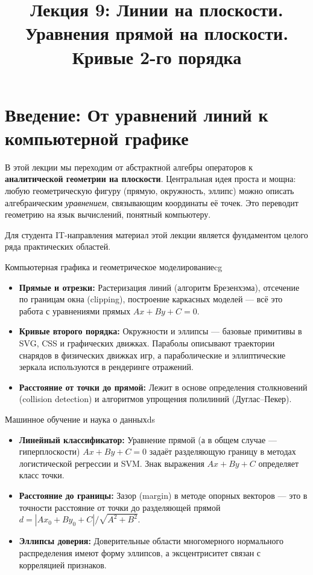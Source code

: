 \documentclass[12pt,a4paper]{article}
\title{Лекция 9: Линии на плоскости. Уравнения прямой на плоскости.
Кривые 2-го порядка}
\author{}
\date{}
\begin{document}
\maketitle
\thispagestyle{fancy}

\section*{Введение: От уравнений линий к компьютерной графике}

В этой лекции мы переходим от абстрактной алгебры операторов к
\textbf{аналитической геометрии на плоскости}. Центральная идея проста и
мощна: любую геометрическую фигуру (прямую, окружность, эллипс) можно
описать алгебраическим \emph{уравнением}, связывающим координаты её точек.
Это переводит геометрию на язык вычислений, понятный компьютеру.

Для студента IT-направления материал этой лекции является фундаментом
целого ряда практических областей.

\begin{remarkIT}{Компьютерная графика и геометрическое моделирование}{cg}
  \begin{itemize}
    \item \textbf{Прямые и отрезки:} Растеризация линий (алгоритм
      Брезенхэма), отсечение по границам окна (clipping), построение
      каркасных моделей — всё это работа с уравнениями прямых
      $Ax + By + C = 0$.
    \item \textbf{Кривые второго порядка:} Окружности и эллипсы — базовые
      примитивы в SVG, CSS и графических движках. Параболы описывают
      траектории снарядов в физических движках игр, а параболические и
      эллиптические зеркала используются в рендеринге отражений.
    \item \textbf{Расстояние от точки до прямой:} Лежит в основе
      определения столкновений (collision detection) и алгоритмов
      упрощения полилиний (Дуглас–Пекер).
  \end{itemize}
\end{remarkIT}

\begin{remarkIT}{Машинное обучение и наука о данных}{ds}
  \begin{itemize}
    \item \textbf{Линейный классификатор:} Уравнение прямой (а в общем
      случае — гиперплоскости) $Ax + By + C = 0$ задаёт разделяющую
      границу в методах логистической регрессии и SVM. Знак выражения
      $Ax + By + C$ определяет класс точки.
    \item \textbf{Расстояние до границы:} Зазор (margin) в методе опорных
      векторов — это в точности расстояние от точки до разделяющей прямой
      $d = |Ax_0 + By_0 + C| / \sqrt{A^2 + B^2}$.
    \item \textbf{Эллипсы доверия:} Доверительные области многомерного
      нормального распределения имеют форму эллипсов, а эксцентриситет
      связан с корреляцией признаков.
  \end{itemize}
\end{remarkIT}
\end{document}

